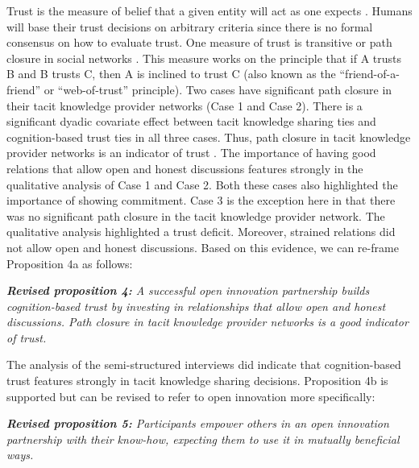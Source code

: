 Trust is the measure of belief that a given entity will act as one expects \citep{richters2011trust}. Humans will base their trust decisions on arbitrary criteria since there is no formal consensus on how to evaluate trust. One measure of trust is transitive or path closure in social networks \citep{coleman1988social,burt2001structural}. This measure works on the principle that if A trusts B and B trusts C, then A is inclined to trust C (also known as the \enquote{friend-of-a-friend} or \enquote{web-of-trust} principle). Two cases have significant path closure in their tacit knowledge provider networks (Case 1 and Case 2). There is a significant dyadic covariate effect between tacit knowledge sharing ties and cognition-based trust ties in all three cases. Thus, path closure in tacit knowledge provider networks is an indicator of trust \citep{sherchan2013survey}. The importance of having good relations that allow open and honest discussions features strongly in the qualitative analysis of Case 1 and Case 2. Both these cases also highlighted the importance of showing commitment. Case 3 is the exception here in that there was no significant path closure in the tacit knowledge provider network. The qualitative analysis highlighted a trust deficit. Moreover, strained relations did not allow open and honest discussions. Based on this evidence, we can re-frame Proposition 4a as follows: \bigskip

\begin{tcolorbox}
\textit{\textbf{Revised proposition 4:} A successful open innovation partnership builds cognition-based trust by investing in relationships that allow open and honest discussions. Path closure in tacit knowledge provider networks is a good indicator of trust.}
\end{tcolorbox}

The analysis of the semi-structured interviews did indicate that cognition-based trust features strongly in tacit knowledge sharing decisions. Proposition 4b is supported but can be revised to refer to open innovation more specifically: \bigskip

\begin{tcolorbox}
\textit{\textbf{Revised proposition 5:} Participants empower others in an open innovation partnership with their know-how, expecting them to use it in mutually beneficial ways.}
\end{tcolorbox}

